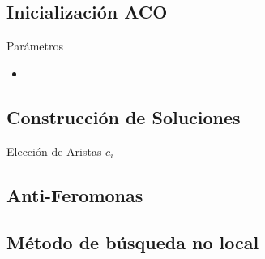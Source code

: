 \subsection{Inicializaci\'on ACO}
\begin{frame}{Par\'ametros}
    \begin{itemize}
        \item 
    \end{itemize}
\end{frame}
\subsection{Construcci\'on de Soluciones}
\begin{frame}{Elecci\'on de Aristas $c_i$}

    
\end{frame}
\subsection{Anti-Feromonas}
\subsection{M\'etodo de b\'usqueda no local}